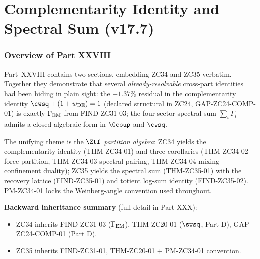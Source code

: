 \documentclass[12pt, a4paper]{article}
\begin{document}
\newpage


\part{Complementarity Identity and Spectral Sum (v17.7)}
\label{part:XXVIII}

\section*{Overview of Part XXVIII}

Part~XXVIII contains two sections, embedding ZC34 and ZC35
verbatim. Together they demonstrate that several
\emph{already-resolvable} cross-part identities had been hiding in
plain sight: the $+1.37\%$ residual in the complementarity identity
$\cwsq + (1+w_{\rm DE}) = 1$ (declared structural in ZC24,
GAP-ZC24-COMP-01) is exactly $\Gamma_{\rm EM}$ from FIND-ZC31-03;
the four-sector spectral sum $\sum_i\Gamma_i$ admits a closed
algebraic form in $\Gcoup$ and $\cwsq$.

The unifying theme is the \emph{$\Ztf$ partition algebra}: ZC34
yields the complementarity identity (THM-ZC34-01) and three
corollaries (THM-ZC34-02 force partition, THM-ZC34-03 spectral
pairing, THM-ZC34-04 mixing--confinement duality);
ZC35 yields the spectral sum (THM-ZC35-01) with the recovery lattice
(FIND-ZC35-01) and totient log-sum identity (FIND-ZC35-02). PM-ZC34-01
locks the Weinberg-angle convention used throughout.

\textbf{Backward inheritance summary} (full detail in Part XXX):
\begin{itemize}[noitemsep,leftmargin=1.5em]
  \item ZC34 inherits FIND-ZC31-03 ($\Gamma_{\rm EM}$),
    THM-ZC20-01 ($\swsq$, Part D), GAP-ZC24-COMP-01 (Part D).
  \item ZC35 inherits FIND-ZC31-01, THM-ZC20-01 + PM-ZC34-01 convention.
\end{itemize}

\medskip
\end{document}
